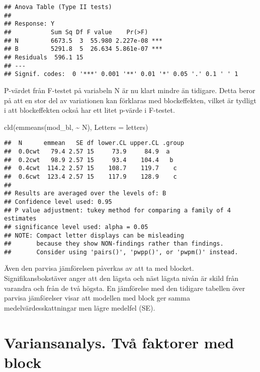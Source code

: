 \documentclass[
]{book}
\newenvironment{Shaded}{\begin{snugshade}}{\end{snugshade}}
\newcommand{\AttributeTok}[1]{\textcolor[rgb]{0.77,0.63,0.00}{#1}}
\newcommand{\FunctionTok}[1]{\textcolor[rgb]{0.00,0.00,0.00}{#1}}
\newcommand{\NormalTok}[1]{#1}
\newcommand{\SpecialCharTok}[1]{\textcolor[rgb]{0.00,0.00,0.00}{#1}}
\theoremstyle{definition}
\theoremstyle{definition}
\theoremstyle{definition}
\theoremstyle{definition}
\theoremstyle{remark}
\begin{document}
\begin{verbatim}
## Anova Table (Type II tests)
## 
## Response: Y
##           Sum Sq Df F value    Pr(>F)    
## N         6673.5  3  55.980 2.227e-08 ***
## B         5291.8  5  26.634 5.861e-07 ***
## Residuals  596.1 15                      
## ---
## Signif. codes:  0 '***' 0.001 '**' 0.01 '*' 0.05 '.' 0.1 ' ' 1
\end{verbatim}

P-värdet från F-testet på variabeln N är nu klart mindre än tidigare. Detta beror på att en stor del av variationen kan förklaras med blockeffekten, vilket är tydligt i att blockeffekten också har ett litet p-värde i F-testet.

\begin{Shaded}
\begin{Highlighting}[]
\FunctionTok{cld}\NormalTok{(}\FunctionTok{emmeans}\NormalTok{(mod\_bl, }\SpecialCharTok{\textasciitilde{}}\NormalTok{ N), }\AttributeTok{Letters =}\NormalTok{ letters)}
\end{Highlighting}
\end{Shaded}

\begin{verbatim}
##  N      emmean   SE df lower.CL upper.CL .group
##  0.0cwt   79.4 2.57 15     73.9     84.9  a    
##  0.2cwt   98.9 2.57 15     93.4    104.4   b   
##  0.4cwt  114.2 2.57 15    108.7    119.7    c  
##  0.6cwt  123.4 2.57 15    117.9    128.9    c  
## 
## Results are averaged over the levels of: B 
## Confidence level used: 0.95 
## P value adjustment: tukey method for comparing a family of 4 estimates 
## significance level used: alpha = 0.05 
## NOTE: Compact letter displays can be misleading
##       because they show NON-findings rather than findings.
##       Consider using 'pairs()', 'pwpp()', or 'pwpm()' instead.
\end{verbatim}

Även den parvisa jämförelsen påverkas av att ta med blocket. Signifikansbokstäver anger att den lägsta och näst lägsta nivån är skild från varandra och från de två högsta. En jämförelse med den tidigare tabellen över parvisa jämförelser visar att modellen med block ger samma medelvärdesskattningar men lägre medelfel (SE).

\hypertarget{variansanalys.-tvuxe5-faktorer-med-block}{%
\section{Variansanalys. Två faktorer med block}\label{variansanalys.-tvuxe5-faktorer-med-block}}
\end{document}
